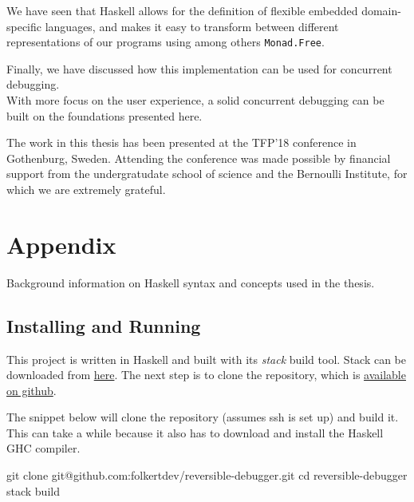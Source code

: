\documentclass[runningheads,plain]{llncs}
\newenvironment{Shaded}{}{}
\newcommand{\FunctionTok}[1]{\textcolor[rgb]{0.02,0.16,0.49}{#1}}
\newcommand{\BuiltInTok}[1]{#1}
\newcommand{\ExtensionTok}[1]{#1}
\newcommand{\NormalTok}[1]{#1}
\begin{document}
We have seen that Haskell allows for the definition of flexible embedded
domain-specific languages, and makes it easy to transform between
different representations of our programs using among others
\texttt{Monad.Free}.

Finally, we have discussed how this implementation can be used for
concurrent debugging.\\
With more focus on the user experience, a solid concurrent debugging can
be built on the foundations presented here.

The work in this thesis has been presented at the TFP'18 conference in
Gothenburg, Sweden. Attending the conference was made possible by
financial support from the undergratudate school of science and the
Bernoulli Institute, for which we are extremely grateful.


%


\pagebreak
\appendix

\section{Appendix}\label{appendix}

Background information on Haskell syntax and concepts used in the
thesis.

\subsection{Installing and Running}\label{installing-and-running}

This project is written in Haskell and built with its \emph{stack} build
tool. Stack can be downloaded from
\href{https://docs.haskellstack.org/en/stable/README/}{here}. The next
step is to clone the repository, which is
\href{https://github.com/folkertdev/reversible-debugger}{available on
github}.

The snippet below will clone the repository (assumes ssh is set up) and
build it. This can take a while because it also has to download and
install the Haskell GHC compiler.

\begin{Shaded}
\begin{Highlighting}[]
\FunctionTok{git}\NormalTok{ clone git@github.com:folkertdev/reversible-debugger.git}
\BuiltInTok{cd}\NormalTok{ reversible-debugger}
\ExtensionTok{stack}\NormalTok{ build}
\end{Highlighting}
\end{Shaded}
\end{document}
